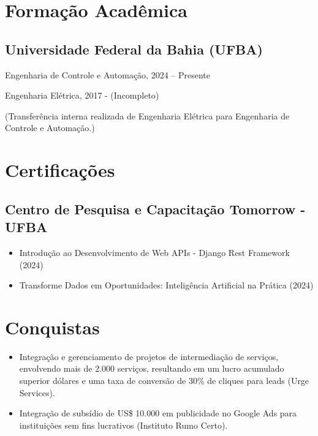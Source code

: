\documentclass[a4paper,10pt]{article}
\begin{document}
\section*{Formação Acadêmica}

\subsection*{Universidade Federal da Bahia (UFBA)}
Engenharia de Controle e Automação, 2024 – Presente 

Engenharia Elétrica, 2017 -  (Incompleto)

(Transferência interna realizada de Engenharia Elétrica para Engenharia de Controle e Automação.)

\section*{Certificações}
\subsection*{Centro de Pesquisa e Capacitação Tomorrow - UFBA}

\begin{itemize}[leftmargin=*]
    \item Introdução ao Desenvolvimento de Web APIs - Django Rest Framework (2024)
   
    \item Transforme Dados em Oportunidades: Inteligência Artificial na Prática (2024)
    
   

\end{itemize}

\section*{Conquistas}

\begin{itemize}[leftmargin=*]
    
    \item Integração e gerenciamento de projetos de intermediação de serviços, envolvendo mais de 2.000 serviços, resultando em um lucro acumulado superior dólares e uma taxa de conversão de 30\% de cliques para leads (Urge Services).
    \item Integração de subsídio de US\$ 10.000 em publicidade no Google Ads para instituições sem fins lucrativos (Instituto Rumo Certo).
    
\end{itemize}
\end{document}
